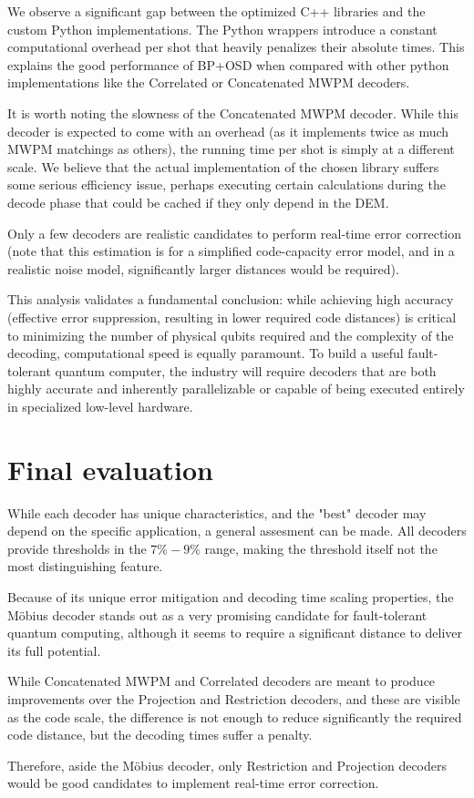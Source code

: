 We observe a significant gap between the optimized C++ libraries and the custom Python implementations. The Python wrappers introduce a constant computational overhead per shot that heavily penalizes their absolute times. This explains the good performance of BP+OSD when compared with other python implementations like the Correlated or Concatenated MWPM decoders.

It is worth noting the slowness of the Concatenated MWPM decoder. While this decoder is expected to come with an overhead (as it implements twice as much MWPM matchings as others), the running time per shot is simply at a different scale. We believe that the actual implementation of the chosen library suffers some serious efficiency issue, perhaps executing certain calculations during the decode phase that could be cached if they only depend in the DEM.

Only a few decoders are realistic candidates to perform real-time error correction (note that this estimation is for a simplified code-capacity error model, and in a realistic noise model, significantly larger distances would be required). 

This analysis validates a fundamental conclusion: while achieving high accuracy (effective error suppression, resulting in lower required code distances) is critical to minimizing the number of physical qubits required and the complexity of the decoding, computational speed is equally paramount. To build a useful fault-tolerant quantum computer, the industry will require decoders that are both highly accurate and inherently parallelizable or capable of being executed entirely in specialized low-level hardware.

\section{Final evaluation}
While each decoder has unique characteristics, and the "best" decoder may depend on the specific application, a general assesment can be made. All decoders provide thresholds in the $7\%-9\%$ range, making the threshold itself not the most distinguishing feature. 

Because of its unique error mitigation and decoding time scaling properties, the Möbius decoder stands out as a very promising candidate for fault-tolerant quantum computing, although it seems to require a significant distance to deliver its full potential. 

While Concatenated MWPM and Correlated decoders are meant to produce improvements over the Projection and Restriction decoders, and these are visible as the code scale, the difference is not enough to reduce significantly the required code distance, but the decoding times suffer a penalty. 

Therefore, aside the Möbius decoder, only Restriction and Projection decoders would be good candidates to implement real-time error correction.